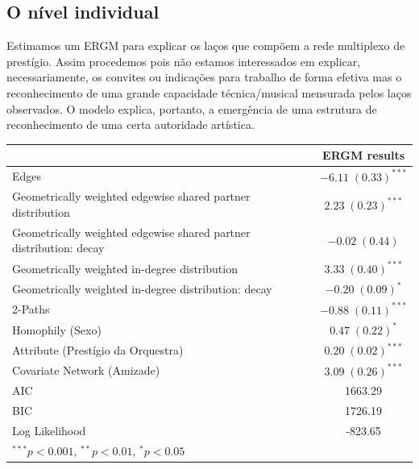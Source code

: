 \documentclass[a4paper, 12pt, openright, oneside, german, french, english, brazil]{abntex2}
\begin{document}
	
	\subsection{O nível individual}
	
	Estimamos um ERGM para explicar os laços que compõem a rede multiplexo de prestígio. Assim procedemos pois não estamos interessados em explicar, necessariamente, os convites ou indicações para trabalho de forma efetiva mas o reconhecimento de uma grande capacidade técnica/musical mensurada pelos laços observados. O modelo explica, portanto, a emergência de uma estrutura de reconhecimento de uma certa autoridade artística.
	
	
	
	\begin{table}[!ht]
			{\begin{tabular}{p{8.5cm} c }
				\hline
				& ERGM results \\
				\hline
				Edges           		& $-6.11 \; (0.33)^{***}$ \\
				Geometrically weighted edgewise shared partner distribution           		& $2.23 \; (0.23)^{***}$  \\
				Geometrically weighted edgewise shared partner distribution: decay     		& $-0.02 \; (0.44)$       \\
				Geometrically weighted in-degree distribution       		& $3.33 \; (0.40)^{***}$  \\
				Geometrically weighted in-degree distribution: decay 		& $-0.20 \; (0.09)^{*}$   \\
				2-Paths          		& $-0.88 \; (0.11)^{***}$ \\
				Homophily (Sexo)  		& $0.47 \; (0.22)^{*}$    \\
				Attribute (Prestígio da Orquestra)  & $0.20 \; (0.02)^{***}$  \\
				Covariate Network (Amizade)    & $3.09 \; (0.26)^{***}$  \\
				\hline
				AIC             & 1663.29                 \\
				BIC             & 1726.19                 \\
				Log Likelihood  & -823.65                 \\
				\hline
				\multicolumn{2}{l}{\scriptsize{$^{***}p<0.001$, $^{**}p<0.01$, $^*p<0.05$}}
			\end{tabular}
		}
		{}
	\end{table}
	
\end{document}

